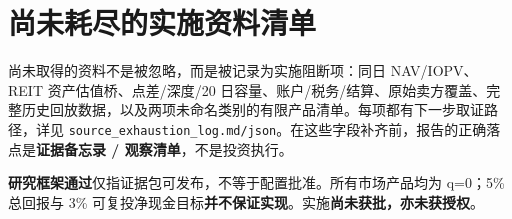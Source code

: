 \section{尚未耗尽的实施资料清单}

尚未取得的资料不是被忽略，而是被记录为实施阻断项：同日 NAV/IOPV、REIT 资产估值桥、点差/深度/20 日容量、账户/税务/结算、原始卖方覆盖、完整历史回放数据，以及两项未命名类别的有限产品清单。每项都有下一步取证路径，详见 \texttt{source\_exhaustion\_log.md/json}。在这些字段补齐前，报告的正确落点是\textbf{证据备忘录 / 观察清单}，不是投资执行。

\begin{disclosurebox}[重要披露]
\small
\textbf{研究框架通过}仅指证据包可发布，不等于配置批准。所有市场产品均为 q=0；5\% 总回报与 3\% 可复投净现金目标\textbf{并不保证实现}。实施\textbf{尚未获批，亦未获授权}。
\end{disclosurebox}
